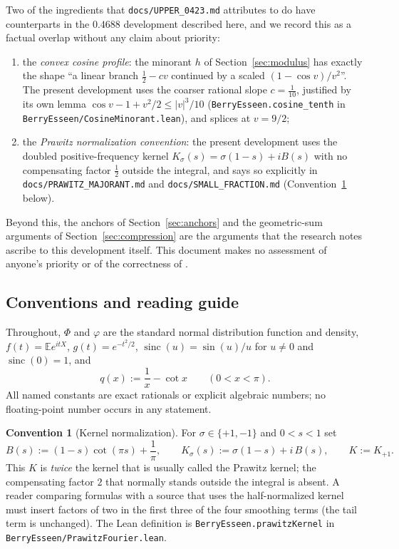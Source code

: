 \documentclass[10pt,a4paper]{article}
\theoremstyle{plain}
\theoremstyle{definition}
\newtheorem{convention}[theorem]{Convention}
\newcommand{\E}{\mathbb{E}}
\newcommand{\lean}[1]{\texttt{#1}}
\newcommand{\file}[1]{\texttt{#1}}
\DeclareMathOperator{\sinc}{sinc}
\begin{document}
Two of the ingredients that \file{docs/UPPER\_0423.md} attributes to
\cite{XiaoLi2026} do have counterparts in the $0.4688$ development described
here, and we record this as a factual overlap without any claim about
priority:
\begin{enumerate}[leftmargin=2.2em]
\item the \emph{convex cosine profile}: the minorant $h$ of
  Section~\ref{sec:modulus} has exactly the shape ``a linear branch
  $\tfrac12-cv$ continued by a scaled $(1-\cos v)/v^2$''. The present
  development uses the coarser rational slope $c=\tfrac1{10}$, justified by
  its own lemma $\cos v-1+v^2/2\le|v|^3/10$
  (\lean{BerryEsseen.cosine\_tenth} in \file{BerryEsseen/CosineMinorant.lean}),
  and splices at $v=9/2$;
\item the \emph{Prawitz normalization convention}: the present development
  uses the doubled positive-frequency kernel
  $K_\sigma(s)=\sigma(1-s)+iB(s)$ with no compensating factor $\tfrac12$
  outside the integral, and says so explicitly in
  \file{docs/PRAWITZ\_MAJORANT.md} and \file{docs/SMALL\_FRACTION.md}
  (Convention~\ref{conv:kernel} below).
\end{enumerate}
Beyond this, the anchors of Section~\ref{sec:anchors} and the geometric-sum
arguments of Section~\ref{sec:compression} are the arguments that the research
notes ascribe to this development itself. This document makes no assessment of
anyone's priority or of the correctness of \cite{XiaoLi2026}.

\subsection{Conventions and reading guide}

Throughout, $\Phi$ and $\varphi$ are the standard normal distribution function
and density, $f(t)=\E e^{itX}$, $g(t)=e^{-t^2/2}$,
$\sinc(u)=\sin(u)/u$ for $u\ne0$ and $\sinc(0)=1$, and
\[
  q(x) := \frac1x - \cot x \qquad (0<x<\pi).
\]
All named constants are exact rationals or explicit algebraic numbers; no
floating-point number occurs in any statement.

\begin{convention}[Kernel normalization]\label{conv:kernel}
For $\sigma\in\{+1,-1\}$ and $0<s<1$ set
\[
  B(s) := (1-s)\cot(\pi s) + \frac1\pi,
  \qquad
  K_\sigma(s) := \sigma(1-s) + i\,B(s),
  \qquad K := K_{+1}.
\]
This $K$ is \emph{twice} the kernel that is usually called the Prawitz kernel;
the compensating factor $2$ that normally stands outside the integral is
absent. A reader comparing formulas with a source that uses the
half-normalized kernel must insert factors of two in the first three of the
four smoothing terms (the tail term is unchanged). The Lean definition is
\lean{BerryEsseen.prawitzKernel} in \file{BerryEsseen/PrawitzFourier.lean}.
\end{convention}
\end{document}
